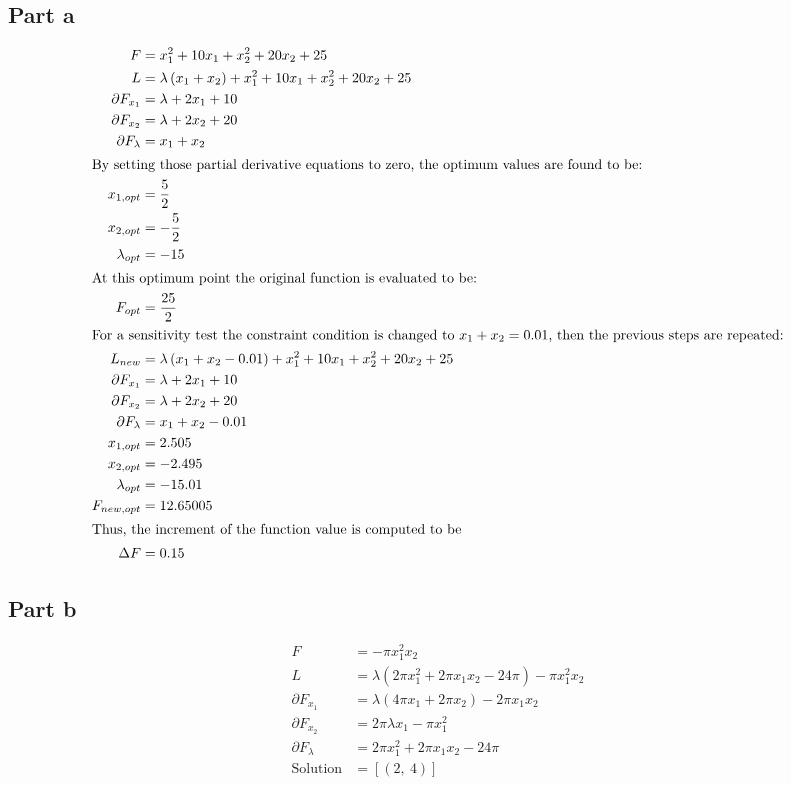\documentclass[a4paper,12pt]{article} %
\begin{document}
\subsection*{Part a}
\begin{align*}
    F &= x_{1}^{2} + 10 x_{1} + x_{2}^{2} + 20 x_{2} + 25 \\
    L &= \lambda \left(x_{1} + x_{2}\right) + x_{1}^{2} + 10 x_{1} + x_{2}^{2} + 20 x_{2} + 25 \\
    \partial F_{x_1} &= \lambda + 2 x_{1} + 10 \\
    \partial F_{x_2} &= \lambda + 2 x_{2} + 20 \\
    \partial F_{\lambda} &= x_{1} + x_{2} \\
    \intertext{By setting those partial derivative equations to zero, the optimum values are found to be:}
    x_{1,opt} &= \frac{5}{2} \\
    x_{2,opt} &= - \frac{5}{2} \\
    \lambda_{opt} &= -15 \\
    \intertext{At this optimum point the original function is evaluated to be:}
    F_{opt} &= \frac{25}{2} \\
    \intertext{For a sensitivity test the constraint condition is changed to $x_1 + x_2 = 0.01$, then the previous
    steps are repeated:}
    L_{new} &= \lambda \left(x_{1} + x_{2} - 0.01\right) + x_{1}^{2} + 10 x_{1} + x_{2}^{2} + 20 x_{2} + 25 \\
    \partial F_{x_1} &= \lambda + 2 x_{1} + 10 \\
    \partial F_{x_2} &= \lambda + 2 x_{2} + 20 \\
    \partial F_{\lambda} &= x_{1} + x_{2} - 0.01 \\
    x_{1,opt} &= 2.505 \\
    x_{2,opt} &= -2.495 \\
    \lambda_{opt} &= -15.01\\
    F_{new,opt} &= 12.65005 \\
    \intertext{Thus, the increment of the function value is computed to be}
    \Delta F &= 0.15
\end{align*}

\subsection*{Part b}
\begin{align*}
    F &= - \pi x_{1}^{2} x_{2} \\
    L &= \lambda \left(2 \pi x_{1}^{2} + 2 \pi x_{1} x_{2} - 24 \pi\right) - \pi x_{1}^{2} x_{2} \\
    \partial F_{x_1} &= \lambda \left(4 \pi x_{1} + 2 \pi x_{2}\right) - 2 \pi x_{1} x_{2} \\
    \partial F_{x_2} &= 2 \pi \lambda x_{1} - \pi x_{1}^{2} \\
    \partial F_{\lambda} &= 2 \pi x_{1}^{2} + 2 \pi x_{1} x_{2} - 24 \pi \\
    \text{Solution} &= \left[ \left( 2, \  4\right)\right]
\end{align*}
\end{document}
